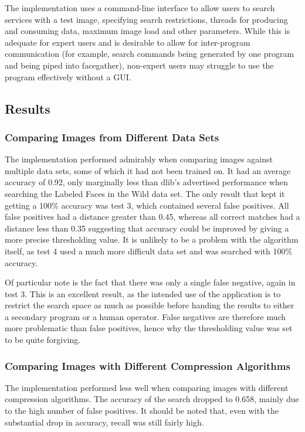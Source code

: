 \documentclass[12pt]{article}
\begin{document}
The implementation uses a command-line interface to allow users to search services with a test image, specifying search restrictions, threads for producing and consuming data, maximum image load and other parameters. While this is adequate for expert users and is desirable to allow for inter-program communication (for example, search commands being generated by one program and being piped into facegather), non-expert users may struggle to use the program effectively without a GUI.

\subsection{Results}
\subsubsection{Comparing Images from Different Data Sets}
The implementation performed admirably when comparing images against multiple data sets, some of which it had not been trained on. It had an average accuracy of 0.92, only marginally less than dlib's advertised performance when searching the Labeled Faces in the Wild data set. The only result that kept it getting a 100\% accuracy was test 3, which contained several false positives. All false positives had a distance greater than 0.45, whereas all correct matches had a distance less than 0.35 suggesting that accuracy could be improved by giving a more precise thresholding value. It is unlikely to be a problem with the algorithm itself, as test 4 used a much more difficult data set and was searched with 100\% accuracy.

Of particular note is the fact that there was only a single false negative, again in test 3. This is an excellent result, as the intended use of the application is to restrict the search space as much as possible before handing the results to either a secondary program or a human operator. False negatives are therefore much more problematic than false positives, hence why the thresholding value was set to be quite forgiving.

\subsubsection{Comparing Images with Different Compression Algorithms}
The implementation performed less well when comparing images with different compression algorithms. The accuracy of the search dropped to 0.658, mainly due to the high number of false positives. It should be noted that, even with the substantial drop in accuracy, recall was still fairly high. 
\end{document}
